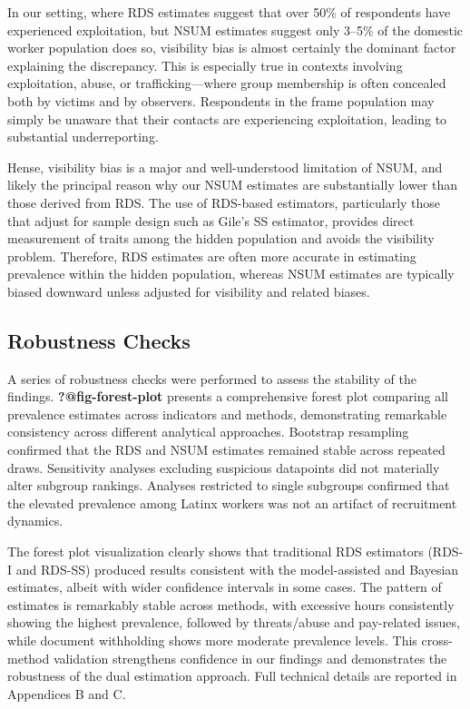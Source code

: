\documentclass[
  12pt,
  letterpaper,
  DIV=11,
  numbers=noendperiod]{scrartcl}
\theoremstyle{plain}
\theoremstyle{definition}
\begin{document}
In our setting, where RDS estimates suggest that over 50\% of
respondents have experienced exploitation, but NSUM estimates suggest
only 3--5\% of the domestic worker population does so, visibility bias
is almost certainly the dominant factor explaining the discrepancy. This
is especially true in contexts involving exploitation, abuse, or
trafficking---where group membership is often concealed both by victims
and by observers. Respondents in the frame population may simply be
unaware that their contacts are experiencing exploitation, leading to
substantial underreporting.

Hense, visibility bias is a major and well-understood limitation of
NSUM, and likely the principal reason why our NSUM estimates are
substantially lower than those derived from RDS. The use of RDS-based
estimators, particularly those that adjust for sample design such as
Gile's SS estimator, provides direct measurement of traits among the
hidden population and avoids the visibility problem. Therefore, RDS
estimates are often more accurate in estimating prevalence within the
hidden population, whereas NSUM estimates are typically biased downward
unless adjusted for visibility and related biases.

\subsection{Robustness Checks}\label{robustness-checks}

A series of robustness checks were performed to assess the stability of
the findings. \textbf{?@fig-forest-plot} presents a comprehensive forest
plot comparing all prevalence estimates across indicators and methods,
demonstrating remarkable consistency across different analytical
approaches. Bootstrap resampling confirmed that the RDS and NSUM
estimates remained stable across repeated draws. Sensitivity analyses
excluding suspicious datapoints did not materially alter subgroup
rankings. Analyses restricted to single subgroups confirmed that the
elevated prevalence among Latinx workers was not an artifact of
recruitment dynamics.

The forest plot visualization clearly shows that traditional RDS
estimators (RDS-I and RDS-SS) produced results consistent with the
model-assisted and Bayesian estimates, albeit with wider confidence
intervals in some cases. The pattern of estimates is remarkably stable
across methods, with excessive hours consistently showing the highest
prevalence, followed by threats/abuse and pay-related issues, while
document withholding shows more moderate prevalence levels. This
cross-method validation strengthens confidence in our findings and
demonstrates the robustness of the dual estimation approach. Full
technical details are reported in Appendices B and C.
\end{document}
